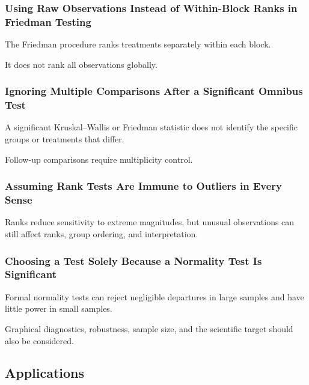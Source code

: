 \subsubsection{Using Raw Observations Instead of Within-Block Ranks in Friedman Testing}

The Friedman procedure ranks treatments separately within each block.

It does not rank all observations globally.

\subsubsection{Ignoring Multiple Comparisons After a Significant Omnibus Test}

A significant Kruskal--Wallis or Friedman statistic does not identify the
specific groups or treatments that differ.

Follow-up comparisons require multiplicity control.

\subsubsection{Assuming Rank Tests Are Immune to Outliers in Every Sense}

Ranks reduce sensitivity to extreme magnitudes, but unusual observations
can still affect ranks, group ordering, and interpretation.

\subsubsection{Choosing a Test Solely Because a Normality Test Is Significant}

Formal normality tests can reject negligible departures in large samples
and have little power in small samples.

Graphical diagnostics, robustness, sample size, and the scientific target
should also be considered.

\subsection{Applications}
\label{subsec:nonparametric-applications}

